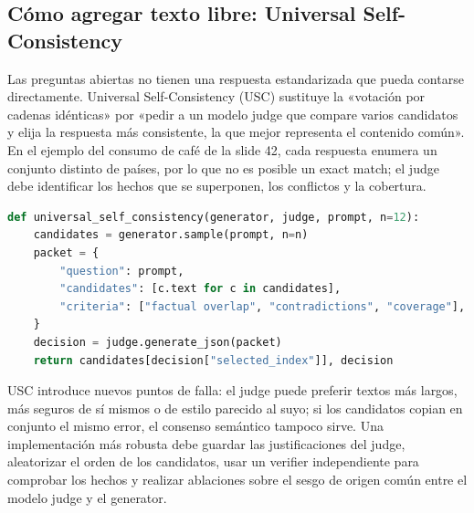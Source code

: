 \subsection{Cómo agregar texto libre: Universal Self-Consistency}

Las preguntas abiertas no tienen una respuesta estandarizada que pueda contarse directamente. Universal Self-Consistency (USC) sustituye la «votación por cadenas idénticas» por «pedir a un modelo judge que compare varios candidatos y elija la respuesta más consistente, la que mejor representa el contenido común». En el ejemplo del consumo de café de la slide 42, cada respuesta enumera un conjunto distinto de países, por lo que no es posible un exact match; el judge debe identificar los hechos que se superponen, los conflictos y la cobertura.



\begin{lstlisting}[language=Python,caption={Implementación estructurada de Universal Self-Consistency para texto libre}]
def universal_self_consistency(generator, judge, prompt, n=12):
    candidates = generator.sample(prompt, n=n)
    packet = {
        "question": prompt,
        "candidates": [c.text for c in candidates],
        "criteria": ["factual overlap", "contradictions", "coverage"],
    }
    decision = judge.generate_json(packet)
    return candidates[decision["selected_index"]], decision
\end{lstlisting}

USC introduce nuevos puntos de falla: el judge puede preferir textos más largos, más seguros de sí mismos o de estilo parecido al suyo; si los candidatos copian en conjunto el mismo error, el consenso semántico tampoco sirve. Una implementación más robusta debe guardar las justificaciones del judge, aleatorizar el orden de los candidatos, usar un verifier independiente para comprobar los hechos y realizar ablaciones sobre el sesgo de origen común entre el modelo judge y el generator.


